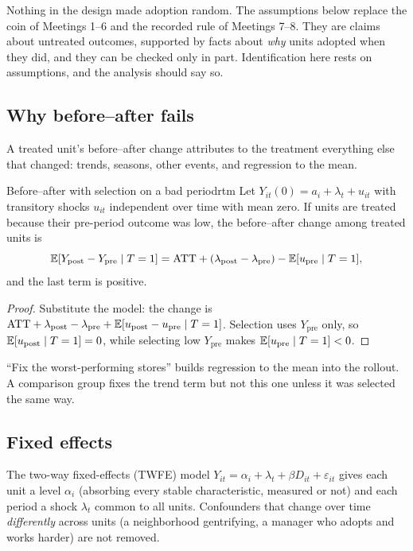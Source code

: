 \documentclass[11pt]{article}
\begin{document}
Nothing in the design made adoption random. The assumptions below replace the coin of Meetings 1--6 and the recorded rule of
Meetings 7--8. They are claims about untreated outcomes, supported by facts about \emph{why} units adopted when they did, and
they can be checked only in part. Identification here rests on assumptions, and the analysis should say so.

\subsection{Why before--after fails}

A treated unit's before--after change attributes to the treatment everything else that changed: trends, seasons, other events,
and regression to the mean.

\begin{prop}{Before--after with selection on a bad period}{rtm}
Let $Y_{it}(0) = a_i + \lambda_t + u_{it}$ with transitory shocks $u_{it}$ independent over time with mean zero. If units are treated
because their pre-period outcome was low, the before--after change among treated units is
\[
  \mathbb{E}[Y_{\text{post}} - Y_{\text{pre}} \mid T = 1] = \text{ATT} + (\lambda_{\text{post}} - \lambda_{\text{pre}}) - \mathbb{E}[u_{\text{pre}} \mid T = 1],
\]
and the last term is positive.
\end{prop}
\begin{proof}
Substitute the model: the change is $\text{ATT} + \lambda_{\text{post}} - \lambda_{\text{pre}} + \mathbb{E}[u_{\text{post}} - u_{\text{pre}} \mid T=1]$. Selection uses
$Y_{\text{pre}}$ only, so $\mathbb{E}[u_{\text{post}} \mid T=1] = 0$, while selecting low $Y_{\text{pre}}$ makes $\mathbb{E}[u_{\text{pre}} \mid T=1] < 0$.
\end{proof}

``Fix the worst-performing stores'' builds regression to the mean into the rollout. A comparison group fixes the trend term but not this
one unless it was selected the same way.

\subsection{Fixed effects}

The two-way fixed-effects (TWFE) model $Y_{it} = \alpha_i + \lambda_t + \beta D_{it} + \varepsilon_{it}$ gives each unit a level $\alpha_i$ (absorbing every
stable characteristic, measured or not) and each period a shock $\lambda_t$ common to all units. Confounders that change over time
\emph{differently} across units (a neighborhood gentrifying, a manager who adopts and works harder) are not removed.
\end{document}
